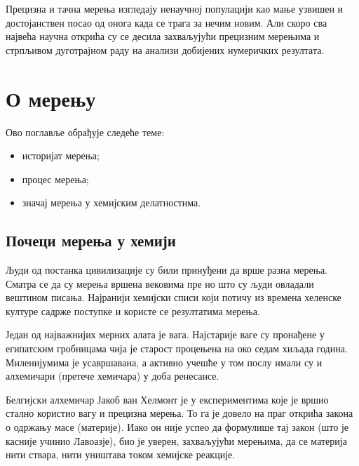 \begin{savequote}
	Прецизна и тачна мерења изгледају ненаучној популацији
	као мање узвишен и достојанствен посао од онога када
	се трага за нечим новим. Али скоро сва највећа научна
	открића су се десила захваљујући прецизним мерењима и
	стрпљивом дуготрајном раду на анализи добијених нумеричких
	резултата.
\end{savequote}
\chapter{О мерењу}

\begin{sazetak}
  Ово поглавље обрађује следеће теме:\\[2mm]
  \begin{itemize}
  \item историјат мерења;
  \item процес мерења;
  \item значај мерења у хемијским делатностима.
  \end{itemize}
\end{sazetak}

\section{Почеци мерења у хемији}

Људи од постанка цивилизације су били принуђени да врше разна мерења.
Сматра се да су мерења вршена вековима пре но што су људи овладали
вештином писања. Најранији хемијски списи који потичу из времена
хеленске културе садрже поступке и користе се резултатима мерења.

Један од најважнијих мерних алата је вага. Најстарије ваге су
пронађене у египатским гробницама чија је старост процењена на
око седам хиљада година. Миленијумима је усавршавана, а активно
учешће у том послу имали су и алхемичари (претече хемичара) у доба
ренесансе.

Белгијски алхемичар Јакоб ван Хелмонт је у експериментима које је
вршио стално користио вагу и прецизна мерења. То га је довело на
праг открића закона о одржању масе (материје). Иако он није успео
да формулише тај закон (што је касније учинио Лавоазје), био је
уверен, захваљујући мерењима, да се материја нити ствара, нити
уништава током хемијске реакције.


